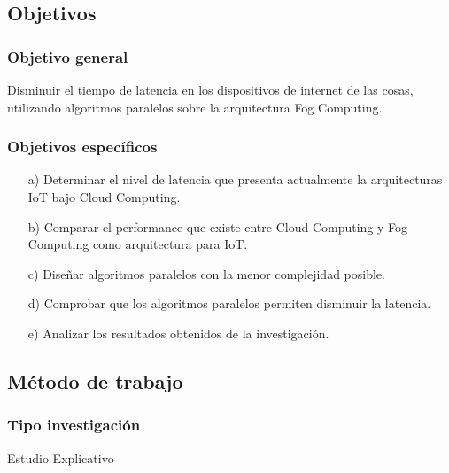     \subsection{Objetivos}
        \subsubsection{Objetivo general}
            Disminuir el tiempo de latencia en los dispositivos de internet de las cosas, utilizando algoritmos paralelos sobre la arquitectura Fog Computing.
        \subsubsection{Objetivos específicos}
            \begin{enumerate}
                \item[a)] Determinar el nivel de latencia que presenta actualmente la arquitecturas IoT bajo Cloud Computing.
                \item[b)] Comparar el performance que existe entre Cloud Computing y Fog Computing como arquitectura para IoT. 
                \item[c)] Diseñar algoritmos  paralelos con la menor complejidad posible.
                \item[d)] Comprobar que los algoritmos paralelos permiten disminuir la latencia.
                \item[e)] Analizar los resultados obtenidos de la investigación.
            \end{enumerate}
    \subsection{Método de trabajo}    
            \subsubsection{Tipo investigación}
                Estudio Explicativo
